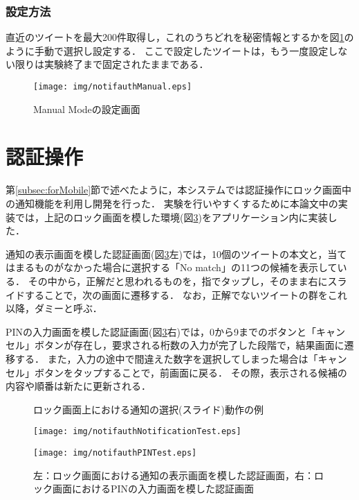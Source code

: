 \subsubsection{設定方法}
直近のツイートを最大200件取得し，これのうちどれを秘密情報とするかを図\ref{fig:notifauthManual}のように手動で選択し設定する．
ここで設定したツイートは，もう一度設定しない限りは実験終了まで固定されたままである．

\begin{figure}
  \begin{center}
    \texttt{[image: img/notifauthManual.eps]}
  \end{center}
  \caption{Manual Modeの設定画面}
  \label{fig:notifauthManual}
\end{figure}

\section{認証操作}\label{sec:authentication}
第\ref{subsec:forMobile}節で述べたように，本システムでは認証操作にロック画面中の通知機能を利用し開発を行った．
実験を行いやすくするために本論文中の実装では，上記のロック画面を模した環境(図\ref{fig:notifauthTest})をアプリケーション内に実装した．

通知の表示画面を模した認証画面(図\ref{fig:notifauthTest}左)では，10個のツイートの本文と，当てはまるものがなかった場合に選択する「No match」の11つの候補を表示している．
その中から，正解だと思われるものを，指でタップし，そのまま右にスライドすることで，次の画面に遷移する．
なお，正解でないツイートの群をこれ以降，ダミーと呼ぶ．

PINの入力画面を模した認証画面(図\ref{fig:notifauthTest}右)では，0から9までのボタンと「キャンセル」ボタンが存在し，要求される桁数の入力が完了した段階で，結果画面に遷移する．
また，入力の途中で間違えた数字を選択してしまった場合は「キャンセル」ボタンをタップすることで，前画面に戻る．
その際，表示される候補の内容や順番は新たに更新される．

\begin{figure}[ht]
  \begin{center}
  \end{center}
  \caption{ロック画面上における通知の選択(スライド)動作の例}
  \label{fig:notificationSliding}
\end{figure}

\begin{figure}[ht]
  \begin{minipage}{0.5\hsize}
    \begin{center}
      \texttt{[image: img/notifauthNotificationTest.eps]}
    \end{center}
  \end{minipage}
  \begin{minipage}{0.5\hsize}
    \begin{center}
      \texttt{[image: img/notifauthPINTest.eps]}
    \end{center}
  \end{minipage}
  \caption{左：ロック画面における通知の表示画面を模した認証画面，右：ロック画面におけるPINの入力画面を模した認証画面}
  \label{fig:notifauthTest}
\end{figure}

